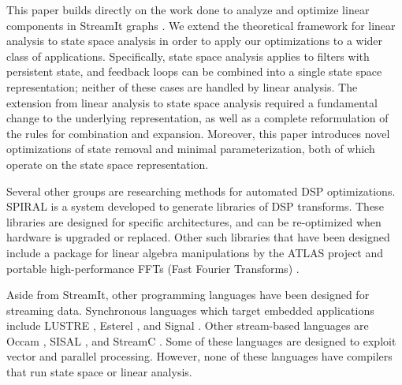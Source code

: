 \label{sec:related}

This paper builds directly on the work done to analyze and optimize
linear components in StreamIt graphs \cite{Lamb}. We extend the
theoretical framework for linear analysis to state space analysis in
order to apply our optimizations to a wider class of applications.
Specifically, state space analysis applies to filters with persistent
state, and feedback loops can be combined into a single state space
representation; neither of these cases are handled by linear analysis.
The extension from linear analysis to state space analysis required a
fundamental change to the underlying representation, as well as a
complete reformulation of the rules for combination and expansion.
Moreover, this paper introduces novel optimizations of state removal
and minimal parameterization, both of which operate on the state space
representation.

Several other groups are researching methods for automated DSP
optimizations. SPIRAL \cite{Spiral} is a system developed to generate
libraries of DSP transforms. These libraries are designed for specific
architectures, and can be re-optimized when hardware is upgraded or
replaced. Other such libraries that have been designed include a
package for linear algebra manipulations by the ATLAS project
\cite{Atlas} and portable high-performance FFTs (Fast Fourier
Transforms) \cite{fftw}.

Aside from StreamIt, other programming languages have been designed
for streaming data. Synchronous languages which target embedded
applications include LUSTRE \cite{Lustre}, Esterel \cite{Esterel}, and
Signal \cite{Signal}. Other stream-based languages are Occam
\cite{Occam}, SISAL \cite{sisal}, and StreamC \cite{streamc}.  Some of
these languages are designed to exploit vector and parallel
processing. However, none of these languages have compilers that run
state space or linear analysis.
